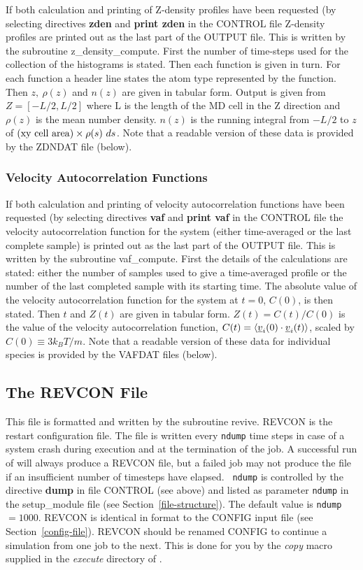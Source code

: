 If both calculation and printing of Z-density profiles have been
requested (by selecting directives {\bf zden} and {\bf print zden}
in the CONTROL file Z-density profiles are printed out as the last
part of the OUTPUT file.  This is written by the subroutine {\sc
z\_density\_compute}.  First the number of time-steps used for the
collection of the histograms is stated.  Then each function is given
in turn.  For each function a header line states the atom type
represented by the function.  Then $z,~\rho(z)$ and $n(z)$ are given
in tabular form. Output is given from $Z = [-L/2,L/2]$ where L is
the length of the MD cell in the Z direction and $\rho(z)$ is the
mean number density.  $n(z)$ is the running integral from $-L/2$ to
$z$ of $({\rm xy~cell~area}) \times \rho(s)~ds$.
Note that a readable version of these data is provided by the
ZDNDAT file (below).

\subsubsection{Velocity Autocorrelation Functions}

If both calculation and printing of velocity autocorrelation functions
have been requested (by selecting directives {\bf vaf} and {\bf print vaf}
in the CONTROL file the velocity autocorrelation function for the system
(either time-averaged or the last complete sample) is printed out as the
last part of the OUTPUT file.  This is written by the subroutine
{\sc vaf\_compute}.  First the details of the calculations are stated:
either the number of samples used to give a time-averaged profile
or the number of the last completed sample with its starting time.
The absolute value of the velocity autocorrelation function for the system
at $t=0$, $C(0)$, is then stated. Then $t$ and $Z(t)$ are given in tabular form.
$Z(t)=C(t)/C(0)$ is the value of the velocity autocorrelation function,
$C(t)=\langle \mbox{$\underline{v}$}_{i}(0) \cdot  \mbox{$\underline{v}$}_{i}(t) \rangle$,
scaled by $C(0) \equiv 3k_B T/m$.  Note that a readable version of these data
for individual species is provided by the VAFDAT files (below).

\subsection{The REVCON File}
\label{revcon-file}

This file is formatted and written by the subroutine {\sc revive}.
REVCON is the restart configuration file.  The file is written every
{\tt ndump} time steps in case of a system crash during execution
and at the termination of the job.  A successful run of \D will
always produce a REVCON file, but a failed job may not produce the
file if an insufficient number of timesteps have elapsed.  {\tt
ndump} is controlled by the directive {\bf dump} in file CONTROL
(see above) and listed as parameter {\tt ndump} in the {\sc
setup\_module} file (see Section~\ref{file-structure}). The default
value is {\tt ndump} $=1000$.  REVCON is identical in format to the
CONFIG input file (see Section~\ref{config-file}).  REVCON should be
renamed CONFIG to continue a simulation from one job to the next.
This is done for you by the {\sl copy} macro supplied in the {\em
execute} directory of \D.

